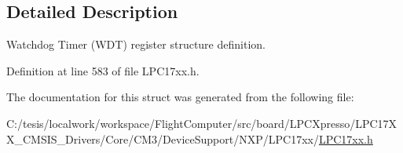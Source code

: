 \subsection{\-Detailed \-Description}
\-Watchdog \-Timer (\-W\-D\-T) register structure definition. 

\-Definition at line 583 of file \-L\-P\-C17xx.\-h.



\-The documentation for this struct was generated from the following file\-:\begin{DoxyCompactItemize}
\item 
\-C\-:/tesis/localwork/workspace/\-Flight\-Computer/src/board/\-L\-P\-C\-Xpresso/\-L\-P\-C17\-X\-X\-\_\-\-C\-M\-S\-I\-S\-\_\-\-Drivers/\-Core/\-C\-M3/\-Device\-Support/\-N\-X\-P/\-L\-P\-C17xx/\hyperlink{_l_p_c17xx_8h}{\-L\-P\-C17xx.\-h}\end{DoxyCompactItemize}
